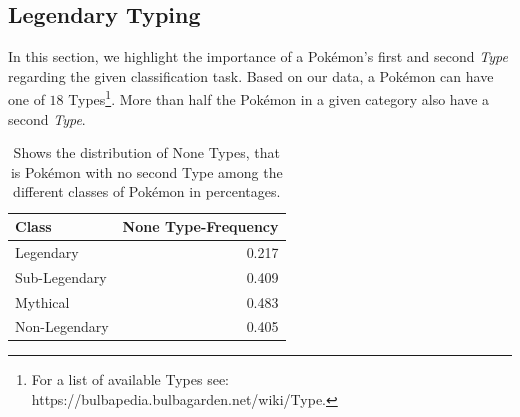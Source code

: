\documentclass[conference]{IEEEtran}
\begin{document}
\subsection{Legendary Typing}
In this section, we highlight the importance of a Pokémon's first and second \textit{Type} regarding the given classification task. Based on our data, a Pokémon can have one of $18$ Types\footnote{For a list of available Types see: https://bulbapedia.bulbagarden.net/wiki/Type.}. More than half the Pokémon in a given category also have a second \textit{Type}.
\begin{table}[b]
	\centering
	\caption{Shows the distribution of None Types, that is Pokémon with no second Type among the different classes of Pokémon in percentages.}
	\label{tab:types}
	\begin{tabular}{lr} \hline
		\textbf{Class} & \textbf{None Type-Frequency} \\ \hline
		Legendary      & 0.217                        \\
		Sub-Legendary  & 0.409                        \\
		Mythical       & 0.483                        \\
		Non-Legendary  & 0.405                        \\ \hline
	\end{tabular}
\end{table}
\end{document}
